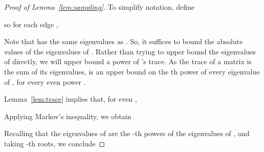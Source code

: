 \documentclass[11pt]{article}
\begin{document}
\begin{proof}[Proof of Lemma~\ref{lem:sampling}]
To simplify notation, define

so for each edge ,


Note that  has the same eigenvalues
  as .
So, it suffices to bound the absolute values of the eigenvalues of .
Rather than trying to upper bound the eigenvalues of 
  directly, we will upper bound a power of 's trace.
As the trace of a matrix is the sum of its eigenvalues,
   is an upper bound
  on the th power of every eigenvalue of ,
 for every even power .

Lemma~\ref{lem:trace} implies that, for even ,

Applying Markov's inequality, we obtain

Recalling that
  the eigenvalues of  are the -th powers of the eigenvalues of ,
 and
  taking -th roots, we conclude

\end{proof}
\end{document}
